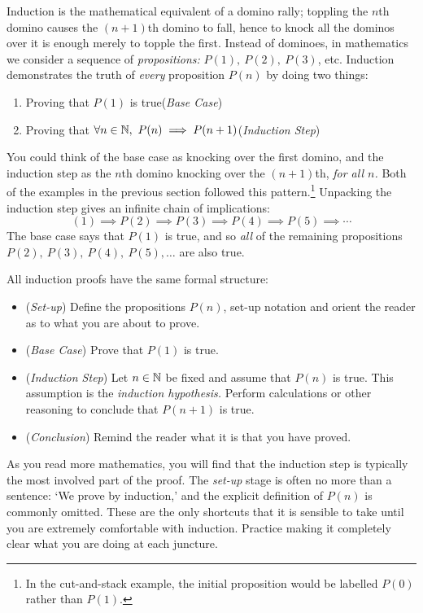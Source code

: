 Induction is the mathematical equivalent of a domino rally; toppling the $n$th domino causes the $(n+1)$th domino to fall, hence to knock all the dominos over it is enough merely to topple the first. Instead of dominoes, in mathematics we consider a sequence of \emph{propositions:} $P(1),\ P(2),\ P(3)$, etc. Induction demonstrates the truth of \emph{every} proposition $P(n)$ by doing two things:
\begin{enumerate}
  \item Proving that $P(1)$ is true\hfill(\emph{Base Case}) 
  \item Proving that $\forall n\in\N,\ P(n)\implies P(n+1)$\hfill(\emph{Induction Step})
\end{enumerate}
You could think of the base case as knocking over the first domino, and the induction step as the $n$th domino knocking over the $(n+1)$th, \emph{for all $n$.} Both of the examples in the previous section followed this pattern.\footnote{In the cut-and-stack example, the initial proposition would be labelled $P(0)$ rather than $P(1)$.} Unpacking the induction step gives an infinite chain of implications:
\[
	(1)\implies P(2)\implies P(3)\implies P(4)\implies P(5)\implies \cdots
\]
The base case says that $P(1)$ is true, and so \emph{all} of the remaining propositions $P(2),\ P(3),\ P(4),\ P(5),\ldots$ are also true.\par

All induction proofs have the same formal structure:

\begin{itemize}
  \item (\emph{Set-up}) Define the propositions $P(n)$, set-up notation and orient the reader as to what you are about to prove.
  \item	(\emph{Base Case}) Prove that $P(1)$ is true.
	\item (\emph{Induction Step}) Let $n\in\mathbb{N}$ be fixed and assume that $P(n)$ is true. This assumption is the \emph{induction hypothesis.} Perform calculations or other reasoning to conclude that $P(n+1)$ is true.
	\item (\emph{Conclusion}) Remind the reader what it is that you have proved.
\end{itemize}

As you read more mathematics, you will find that the induction step is typically the most involved part of the proof. The \emph{set-up} stage is often no more than a sentence: `We prove by induction,' and the explicit definition of $P(n)$ is commonly omitted. These are the only shortcuts that it is sensible to take until you are extremely comfortable with induction. Practice making it completely clear what you are doing at each juncture.\par


